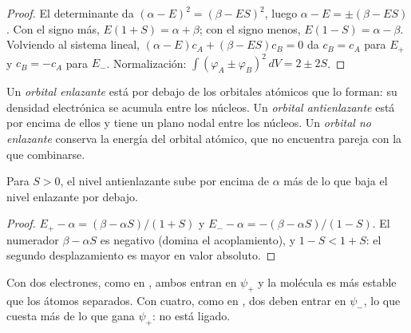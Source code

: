 \begin{proof}
El determinante da $(\alpha - E)^2 = (\beta - ES)^2$, luego $\alpha - E = \pm(\beta - ES)$.
Con el signo más, $E(1 + S) = \alpha + \beta$; con el signo menos, $E(1 - S) = \alpha
- \beta$. Volviendo al sistema lineal, $(\alpha - E)c_A + (\beta - ES)c_B = 0$ da $c_B
= c_A$ para $E_+$ y $c_B = -c_A$ para $E_-$. Normalización: $\int(\varphi_A \pm
\varphi_B)^2\,dV = 2 \pm 2S$.
\end{proof}

\begin{definition}\label{def:b2:diatomic-mos:bonding}
Un \emph{orbital enlazante} está por debajo de los orbitales atómicos
que lo forman: su densidad electrónica se acumula entre los núcleos. Un
\emph{orbital antienlazante} está por encima de ellos y tiene un
plano nodal entre los núcleos. Un \emph{orbital no enlazante}
conserva la energía del orbital atómico, que no encuentra pareja con la que
combinarse.
\end{definition}

\begin{proposition}\label{prop:b2:diatomic-mos:asymmetry}
Para $S > 0$, el nivel antienlazante sube por encima de $\alpha$ más de lo que
baja el nivel enlazante por debajo.
\end{proposition}

\begin{proof}
$E_+ - \alpha = (\beta - \alpha S)/(1 + S)$ y $E_- - \alpha = -(\beta - \alpha S)/(1 - S)$.
El numerador $\beta - \alpha S$ es negativo (domina el acoplamiento), y $1 - S < 1
+ S$: el segundo desplazamiento es mayor en valor absoluto.
\end{proof}

Con dos electrones, como en , ambos entran en $\psi_+$ y la molécula es más
estable que los átomos separados. Con cuatro, como en , dos deben entrar en $\psi_-$,
lo que cuesta más de lo que gana $\psi_+$:  no está ligado.

